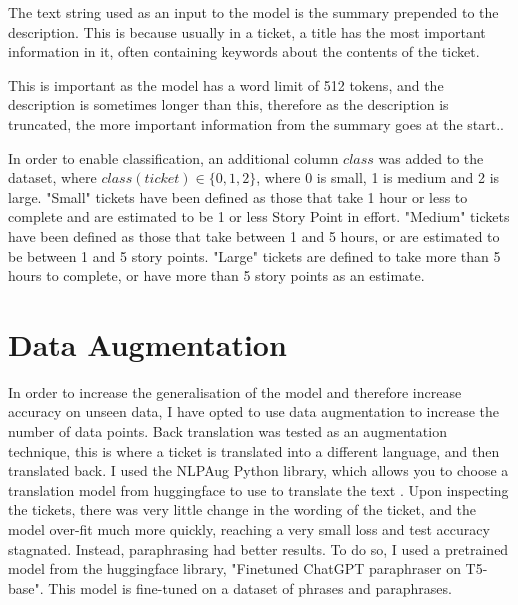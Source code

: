 \documentclass{UoYCSproject}
\begin{document}
    The text string used as an input to the model is the summary prepended to the description.
    This is because usually in a ticket, a title has the most important information in it, often containing keywords about the contents of the ticket. \par
    This is important as the model has a word limit of 512 tokens, and the description is sometimes longer than this, therefore as the description is truncated, the more important information from the summary goes at the start..

    In order to enable classification, an additional column $class$ was added to the dataset, where $class(ticket) \in \{0,1,2\}$, where 0 is small, 1 is medium and 2 is large.
    "Small" tickets have been defined as those that take 1 hour or less to complete and are estimated to be 1 or less Story Point in effort.
    "Medium" tickets have been defined as those that take between 1 and 5 hours, or are estimated to be between 1 and 5 story points.
    "Large" tickets are defined to take more than 5 hours to complete, or have more than 5 story points as an estimate.


%


    \section{Data Augmentation}\label{sec:data-augmentation}
    In order to increase the generalisation of the model and therefore increase accuracy on unseen data, I have opted to use data augmentation to increase the number of data points.
    Back translation was tested as an augmentation technique, this is where a ticket is translated into a different language, and then translated back.
    I used the NLPAug Python library, which allows you to choose a translation model from huggingface to use to translate the text \cite{ma2019nlpaug}.
    Upon inspecting the tickets, there was very little change in the wording of the ticket, and the model over-fit much more quickly, reaching a very small loss and test accuracy stagnated.
    Instead, paraphrasing had better results.
    To do so, I used a pretrained model from the huggingface library, "Finetuned ChatGPT paraphraser on T5-base". \cite{chatgpt_paraphraser}
    This model is fine-tuned on a dataset of phrases and paraphrases.
\end{document}

